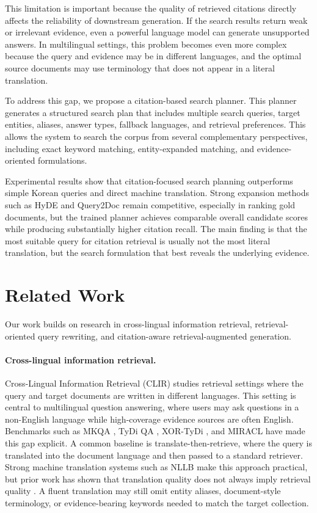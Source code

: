 \documentclass{article}
\begin{document}
This limitation is important because the quality of retrieved citations directly affects the reliability of downstream generation. 
If the search results return weak or irrelevant evidence, even a powerful language model can generate unsupported answers. 
In multilingual settings, this problem becomes even more complex because the query and evidence may be in different languages, and the optimal source documents may use terminology that does not appear in a literal translation.

To address this gap, we propose a citation-based search planner. 
This planner generates a structured search plan that includes multiple search queries, target entities, aliases, answer types, fallback languages, and retrieval preferences. 
This allows the system to search the corpus from several complementary perspectives, including exact keyword matching, entity-expanded matching, and evidence-oriented formulations.

Experimental results show that citation-focused search planning outperforms simple Korean queries and direct machine translation. 
Strong expansion methods such as HyDE and Query2Doc remain competitive, especially in ranking gold documents, but the trained planner achieves comparable overall candidate scores while producing substantially higher citation recall. 
The main finding is that the most suitable query for citation retrieval is usually not the most literal translation, but the search formulation that best reveals the underlying evidence.

\section{Related Work}
\label{sec:related_work}

Our work builds on research in cross-lingual information retrieval, retrieval-oriented query rewriting, and citation-aware retrieval-augmented generation.

\paragraph{Cross-lingual information retrieval.}
Cross-Lingual Information Retrieval (CLIR) studies retrieval settings where the query and target documents are written in different languages. This setting is central to multilingual question answering, where users may ask questions in a non-English language while high-coverage evidence sources are often English. Benchmarks such as MKQA \cite{longpre2020mkqa}, TyDi QA \cite{clark2020tydi}, XOR-TyDi \cite{asai2020xor}, and MIRACL \cite{fang2023miracl} have made this gap explicit. A common baseline is translate-then-retrieve, where the query is translated into the document language and then passed to a standard retriever. Strong machine translation systems such as NLLB \cite{nllb2022nllb} make this approach practical, but prior work has shown that translation quality does not always imply retrieval quality \cite{bi2020constraint}. A fluent translation may still omit entity aliases, document-style terminology, or evidence-bearing keywords needed to match the target collection.
\end{document}

